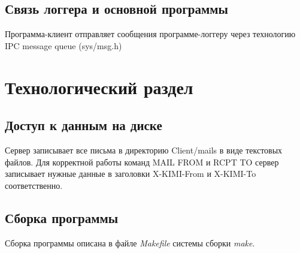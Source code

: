 \documentclass[a4paper,12pt]{report}
\begin{document}
\section{Связь логгера и основной программы}
Программа-клиент отправляет сообщения программе-логгеру через технологию IPC message queue (sys/msg.h)



%
%
%

\chapter{Технологический раздел}

\section{Доступ к данным на диске}
Сервер записывает все письма в директорию Client/mails в виде текстовых файлов.
Для корректной работы команд MAIL FROM и RCPT TO сервер записывает нужные данные в заголовки X-KIMI-From и X-KIMI-To соответственно.

\section{Сборка программы}
Сборка программы описана в файле \textit{Makefile} системы сборки \textit{make}.
\end{document}
